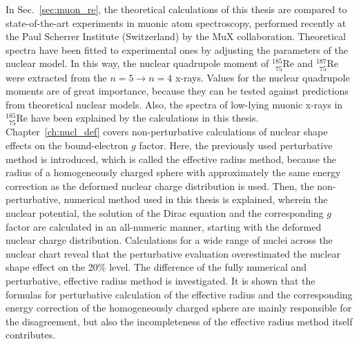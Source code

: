 In Sec.~\ref{sec:muon_re}, the theoretical calculations of this thesis are compared to state-of-the-art experiments in muonic atom spectroscopy, performed recently at the Paul Scherrer Institute (Switzerland) by the MuX collaboration. Theoretical spectra have been fitted to experimental ones by adjusting the parameters of the nuclear model. In this way, the nuclear quadrupole moment of $_{\phantom{1}75}^{185}$Re and $_{\phantom{1}75}^{187}$Re were extracted from the ${n}{=}{5}\rightarrow {n}{=}{4}$ x-rays. Values for the nuclear quadrupole moments are of great importance, because they can be tested against predictions from theoretical nuclear models. 
Also, the spectra of low-lying muonic x-rays in $_{\phantom{1}75}^{185}$Re have been explained by the calculations in this thesis.\\[11pt]%
%
Chapter~\ref{ch:nucl_def} covers non-perturbative calculations of nuclear shape effects on the bound-electron $g$ factor. Here, the previously used perturbative method is introduced, which is called the effective radius method, because the radius of a homogeneously charged sphere with approximately the same energy correction as the deformed nuclear charge distribution is used. 
Then, the non-perturbative, numerical method used in this thesis is explained, wherein the nuclear potential, the solution of the Dirac equation and the corresponding $g$ factor are calculated in an all-numeric manner, starting with the deformed nuclear charge distribution. Calculations for a wide range of nuclei across the nuclear chart reveal that the perturbative evaluation overestimated the nuclear shape effect on the 20\% level. The difference of the fully numerical and perturbative, effective radius method is investigated. It is shown that the formulas for perturbative calculation of the effective radius and the corresponding energy correction of the homogeneously charged sphere are mainly responsible for the disagreement, but also the incompleteness of the effective radius method itself contributes.


